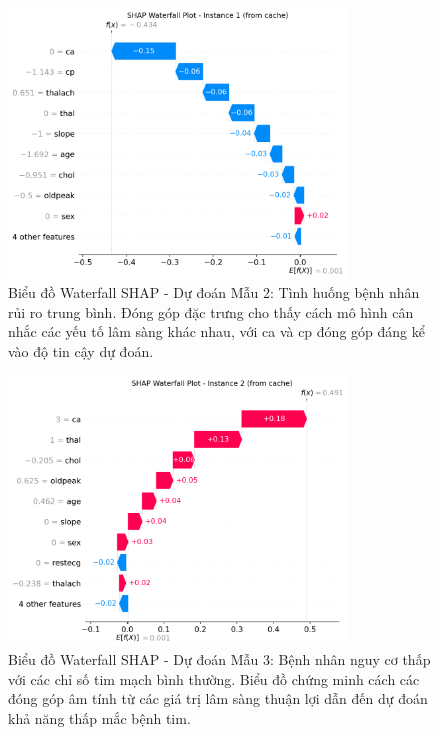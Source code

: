 \begin{figure}[H]
\centering
\includegraphics[width=0.8\textwidth]{Result/cleveland_dataset/Catboost/SHAP/Waterfall 2.png}
\caption{Biểu đồ Waterfall SHAP - Dự đoán Mẫu 2: Tình huống bệnh nhân rủi ro trung bình. Đóng góp đặc trưng cho thấy cách mô hình cân nhắc các yếu tố lâm sàng khác nhau, với ca và cp đóng góp đáng kể vào độ tin cậy dự đoán.}
\label{fig:waterfall_2}
\end{figure}

\begin{figure}[H]
\centering
\includegraphics[width=0.8\textwidth]{Result/cleveland_dataset/Catboost/SHAP/Waterfall 3.png}
\caption{Biểu đồ Waterfall SHAP - Dự đoán Mẫu 3: Bệnh nhân nguy cơ thấp với các chỉ số tim mạch bình thường. Biểu đồ chứng minh cách các đóng góp âm tính từ các giá trị lâm sàng thuận lợi dẫn đến dự đoán khả năng thấp mắc bệnh tim.}
\label{fig:waterfall_3}
\end{figure}

